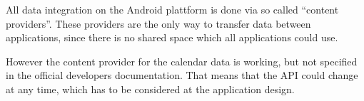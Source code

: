 All data integration on the Android plattform is done via
so called ``content providers''. These providers are the
only way to transfer data between applications, since there
is no shared space which all applications could use.

However the content provider for the calendar data is
working, but not specified in the official developers
documentation. That means that the API could change at
any time, which has to be considered at the application
design.
